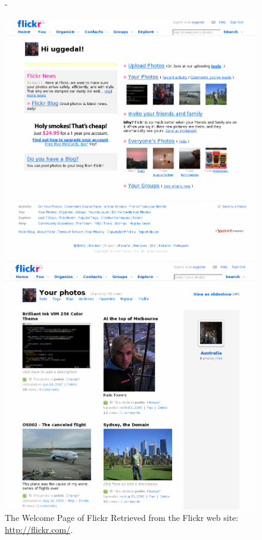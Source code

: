 \begin{figure}
  \centering
  \strictpagechecktrue
  \begin{adjustwidth*}{0em}{-\wholemargin}
    \begin{minipage}[t]{0.475\wholewidth}
      \includegraphics[width=1\textwidth]{scrsh_flickr_welcome}
      \caption[Flickr Welcome Page]{%
         The Welcome Page of Flickr
         Retrieved from the Flickr web site:
        \url{http://flickr.com/}.}
      \label{figure:scrsh.flickr.welcome}
    \end{minipage}
    \hfill
    \begin{minipage}[t]{0.475\wholewidth}
      \includegraphics[width=1\textwidth]{scrsh_flickr_photos}

\end{minipage}
\end{adjustwidth*}
\end{figure}

